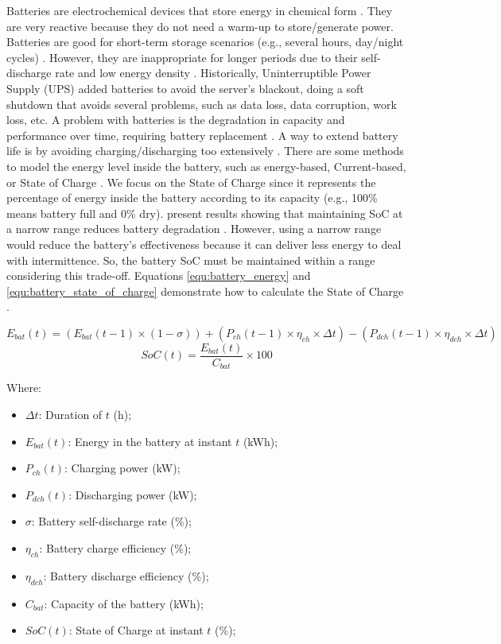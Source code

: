 Batteries are electrochemical devices that store energy in chemical form \cite{rostirolla2022survey, yilanci2009review, wang2012energy}. They are very reactive because they do not need a warm-up to store/generate power. Batteries are good for short-term storage scenarios (e.g., several hours, day/night cycles) \cite{rostirolla2022survey}. However, they are inappropriate for longer periods due to their self-discharge rate and low energy density \cite{rostirolla2022survey, yilanci2009review}. Historically, Uninterruptible Power Supply (UPS) added batteries to avoid the server's blackout, doing a soft shutdown that avoids several problems, such as data loss, data corruption, work loss, etc. A problem with batteries is the degradation in capacity and performance over time, requiring battery replacement \cite{rostirolla2022survey}. A way to extend battery life is by avoiding charging/discharging too extensively \cite{xu2016modeling}. There are some methods to model the energy level inside the battery, such as energy-based, Current-based, or State of Charge \cite{rostirolla2022survey}. We focus on the State of Charge since it represents the percentage of energy inside the battery according to its capacity (e.g., 100\% means battery full and 0\% dry). \citeauthor{xu2016modeling} present results showing that maintaining SoC at a narrow range reduces battery degradation \cite{xu2016modeling}. However, using a narrow range would reduce the battery's effectiveness because it can deliver less energy to deal with intermittence. So, the battery SoC must be maintained within a range considering this trade-off. Equations \ref{equ:battery_energy} and \ref{equ:battery_state_of_charge} demonstrate how to calculate the State of Charge \cite{haddad2019mixed}. 

\begin{equation}
    \label{equ:battery_energy}
    E_{bat}(t) = (E_{bat}(t-1) \times (1 - \sigma)) + (P_{ch}(t-1) \times \eta_{ch} \times \Delta t) - (P_{dch}(t-1) \times \eta_{dch} \times \Delta t)
\end{equation}
\begin{equation}
    \label{equ:battery_state_of_charge}
    SoC(t) = \frac{E_{bat}(t)}{C_{bat}} \times 100
\end{equation}

Where:
\begin{itemize}
    \item $\Delta t$: Duration of $t$ (h);
    \item $E_{bat}(t)$: Energy in the battery at instant $t$ (kWh);
    \item $P_{ch}(t)$: Charging power (kW);
    \item $P_{dch}(t)$: Discharging power (kW);
    \item $\sigma$: Battery self-discharge rate (\%);
    \item $\eta_{ch}$: Battery charge efficiency (\%);
    \item $\eta_{dch}$: Battery discharge efficiency (\%);
    \item $C_{bat}$: Capacity of the battery (kWh);
    \item $SoC(t)$: State of Charge at instant $t$ (\%);
\end{itemize}

